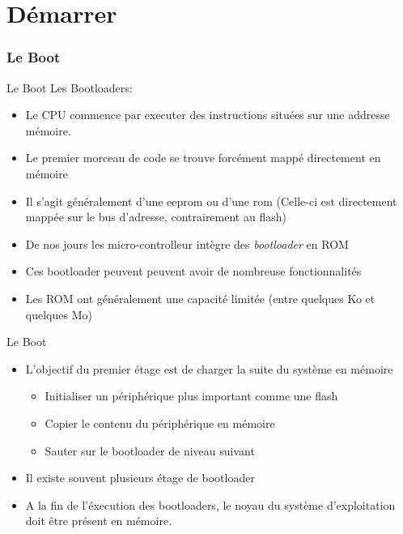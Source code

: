 %
%

\part{Démarrer}

\begin{frame}
  \partpage
\end{frame}

\begin{frame}
  \tableofcontents[currentpart]
\end{frame}

\section{Le Boot}

\begin{frame}[fragile=singleslide]{Le Boot}
  Les Bootloaders:
  \begin{itemize}
  \item Le CPU commence par  executer des instructions situées sur une
    addresse mémoire.
  \item  Le  premier  morceau  de  code se  trouve  forcément  mappé
    directement en mémoire
  \item Il  s'agit généralement d'une eeprom ou  d'une rom (Celle-ci
    est directement  mappée sur  le bus d'adresse,  contrairement au
    flash)
  \item   De    nos   jours   les    micro-controlleur   intègre   des
    \emph{bootloader} en ROM
  \item   Ces   bootloader   peuvent   peuvent  avoir   de   nombreuse
    fonctionnalités
  \item Les ROM ont  généralement une capacité limitée (entre quelques
    Ko et quelques Mo)
  \end{itemize}
\end{frame}

\begin{frame}[fragile=singleslide]{Le Boot}
  \begin{itemize} 
  \item L'objectif du premier étage est de charger la suite du système
    en mémoire
    \begin{itemize}
    \item Initialiser un périphérique plus important comme une flash
    \item Copier le contenu du périphérique en mémoire
    \item Sauter sur le bootloader de niveau suivant
    \end{itemize}
  \item Il existe souvent plusieurs étage de bootloader
  \item A la  fin de l'éxecution des bootloaders,  le noyau du système
    d'exploitation doit être présent en mémoire.
  \end{itemize}
\end{frame}

